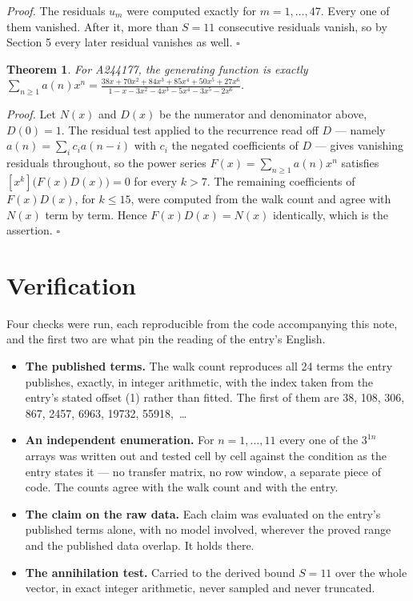 \documentclass[11pt]{article}
\newtheorem{theorem}{Theorem}
\theoremstyle{definition}
\begin{document}
{\itshape Proof.} The residuals $u_m$ were computed exactly for $m = 1,\dots,47$. Every one of them vanished. After it, more than $S = 11$ consecutive residuals vanish, so by Section 5 every later residual vanishes as well. $\square$

\begin{theorem} For A244177, the generating function is exactly $\sum_{n\ge 1} a(n)x^n = \frac{38x + 70x^{2} + 84x^{3} + 85x^{4} + 50x^{5} + 27x^{6}}{1 - x - 3x^{2} - 4x^{3} - 5x^{4} - 3x^{5} - 2x^{6}}$.\end{theorem}

{\itshape Proof.} Let $N(x)$ and $D(x)$ be the numerator and denominator above, $D(0)=1$. The residual test applied to the recurrence read off $D$ --- namely $a(n) = \sum_i c_i a(n-i)$ with $c_i$ the negated coefficients of $D$ --- gives vanishing residuals throughout, so the power series $F(x)=\sum_{n\ge 1}a(n)x^n$ satisfies $[x^k]\bigl(F(x)D(x)\bigr) = 0$ for every $k > 7$. The remaining coefficients of $F(x)D(x)$, for $k \le 15$, were computed from the walk count and agree with $N(x)$ term by term. Hence $F(x)D(x) = N(x)$ identically, which is the assertion. $\square$

\section{Verification}

Four checks were run, each reproducible from the code accompanying this note, and the first two are what pin the reading of the entry's English.

\begin{itemize}

\item {\bfseries The published terms.} The walk count reproduces all 24 terms the entry publishes, exactly, in integer arithmetic, with the index taken from the entry's stated offset (1) rather than fitted. The first of them are 38, 108, 306, 867, 2457, 6963, 19732, 55918,~\dots

\item {\bfseries An independent enumeration.} For $n = 1,\dots,11$ every one of the $3^{1n}$ arrays was written out and tested cell by cell against the condition as the entry states it --- no transfer matrix, no row window, a separate piece of code. The counts agree with the walk count and with the entry.

\item {\bfseries The claim on the raw data.} Each claim was evaluated on the entry's published terms alone, with no model involved, wherever the proved range and the published data overlap. It holds there.

\item {\bfseries The annihilation test.} Carried to the derived bound $S = 11$ over the whole vector, in exact integer arithmetic, never sampled and never truncated.

\end{itemize}
\end{document}
